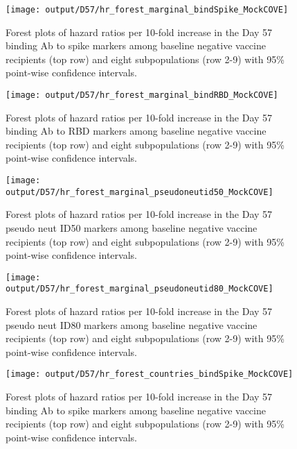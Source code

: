 \documentclass[
]{article}
\begin{document}
\begin{figure}[H]
    \centering
    \texttt{[image: output/D57/hr\_forest\_marginal\_bindSpike\_MockCOVE]}
    \caption{Forest plots of hazard ratios per 10-fold increase in the Day 57 binding Ab to spike markers among baseline negative vaccine recipients (top row) and eight subpopulations (row 2-9) with 95\% point-wise confidence intervals.}
\end{figure}

\begin{figure}[H]
    \centering
    \texttt{[image: output/D57/hr\_forest\_marginal\_bindRBD\_MockCOVE]}
    \caption{Forest plots of hazard ratios per 10-fold increase in the  Day 57 binding Ab to RBD markers among baseline negative vaccine recipients (top row) and eight subpopulations (row 2-9) with 95\% point-wise confidence intervals.}
\end{figure}

\ifENSEMBLE
\else

\begin{figure}[H]
    \centering
    \texttt{[image: output/D57/hr\_forest\_marginal\_pseudoneutid50\_MockCOVE]}
    \caption{Forest plots of hazard ratios per 10-fold increase in the  Day 57 pseudo neut ID50 markers among baseline negative vaccine recipients (top row) and eight subpopulations (row 2-9) with 95\% point-wise confidence intervals.}
\end{figure}

\begin{figure}[H]
    \centering
    \texttt{[image: output/D57/hr\_forest\_marginal\_pseudoneutid80\_MockCOVE]}
    \caption{Forest plots of hazard ratios per 10-fold increase in the  Day 57 pseudo neut ID80 markers among baseline negative vaccine recipients (top row) and eight subpopulations (row 2-9) with 95\% point-wise confidence intervals.}
\end{figure}

\fi

\clearpage

\newif\ifShowCountry

\ifShowCountry

\begin{figure}[H]
    \centering
    \texttt{[image: output/D57/hr\_forest\_countries\_bindSpike\_MockCOVE]}
    \caption{Forest plots of hazard ratios per 10-fold increase in the Day 57 binding Ab to spike markers among baseline negative vaccine recipients (top row) and eight subpopulations (row 2-9) with 95\% point-wise confidence intervals.}
\end{figure}
\end{document}
